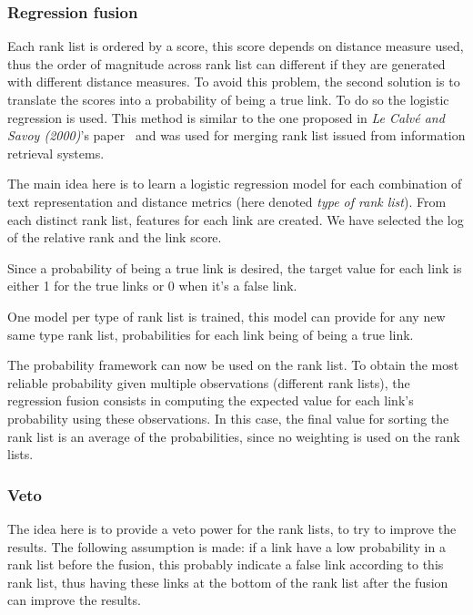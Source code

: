 \subsubsection{Regression fusion \label{sec:regression_fusion}}

Each rank list is ordered by a score, this score depends on distance measure used, thus the order of magnitude across rank list can different if they are generated with different distance measures.
To avoid this problem, the second solution is to translate the scores into a probability of being a true link.
To do so the logistic regression is used.
This method is similar to the one proposed in \textit{Le Calvé and Savoy (2000)}'s paper~\cite{le_calve_database_merging} and was used for merging rank list issued from information retrieval systems.

The main idea here is to learn a logistic regression model for each combination of text representation and distance metrics (here denoted \textit{type of rank list}).
From each distinct rank list, features for each link are created.
We have selected the log of the relative rank and the link score.

Since a probability of being a true link is desired, the target value for each link is either 1 for the true links or 0 when it's a false link.

One model per type of rank list is trained, this model can provide for any new same type rank list, probabilities for each link being of being a true link.

The probability framework can now be used on the rank list.
To obtain the most reliable probability given multiple observations (different rank lists), the regression fusion consists in computing the expected value for each link's probability using these observations.
In this case, the final value for sorting the rank list is an average of the probabilities, since no weighting is used on the rank lists.

\subsubsection{Veto}

The idea here is to provide a veto power for the rank lists, to try to improve the results.
The following assumption is made: if a link have a low probability in a rank list before the fusion, this probably indicate a false link according to this rank list, thus having these links at the bottom of the rank list after the fusion can improve the results.

